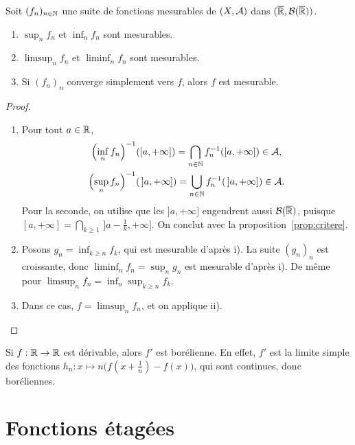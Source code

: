 \documentclass[11pt]{article}
\begin{document}
\begin{proposition}\label{prop:limites}
Soit $(f_n)_{n\in\mathbb{N}}$ une suite de fonctions mesurables de $(X,\mathcal{A})$ dans $(\overline{\mathbb{R}},\mathcal{B}(\overline{\mathbb{R}}))$.
\begin{enumerate}[label=\roman*)]
  \item $\sup_n f_n$ et $\inf_n f_n$ sont mesurables.
  \item $\limsup_n f_n$ et $\liminf_n f_n$ sont mesurables.
  \item Si $(f_n)_n$ converge simplement vers $f$, alors $f$ est mesurable.
\end{enumerate}
\end{proposition}

\begin{proof}
\begin{enumerate}[label=\roman*)]
  \item Pour tout $a \in \mathbb{R}$,
  \begin{gather*}
    \Bigl(\inf_n f_n\Bigr)^{-1}([a,+\infty]) = \bigcap_{n\in\mathbb{N}} f_n^{-1}([a,+\infty]) \in \mathcal{A},\\
    \Bigl(\sup_n f_n\Bigr)^{-1}(\,]a,+\infty]) = \bigcup_{n\in\mathbb{N}} f_n^{-1}(\,]a,+\infty]) \in \mathcal{A}.
  \end{gather*}
  Pour la seconde, on utilise que les $]a,+\infty]$ engendrent aussi $\mathcal{B}(\overline{\mathbb{R}})$, puisque $[a,+\infty] = \bigcap_{k\geq 1}\,]a-\frac1k,+\infty]$. On conclut avec la proposition~\ref{prop:critere}.
  \item Posons $g_n = \inf_{k\geq n} f_k$, qui est mesurable d'après i). La suite $(g_n)_n$ est croissante, donc $\liminf_n f_n = \sup_n g_n$ est mesurable d'après i). De même pour $\limsup_n f_n = \inf_n \sup_{k\geq n} f_k$.
  \item Dans ce cas, $f = \limsup_n f_n$, et on applique ii). \qedhere
\end{enumerate}
\end{proof}

\begin{exemple}
Si $f : \mathbb{R} \to \mathbb{R}$ est dérivable, alors $f'$ est borélienne. En effet, $f'$ est la limite simple des fonctions $h_n : x \mapsto n\bigl(f(x+\frac1n)-f(x)\bigr)$, qui sont continues, donc boréliennes.
\end{exemple}

\section{Fonctions étagées}
\end{document}
